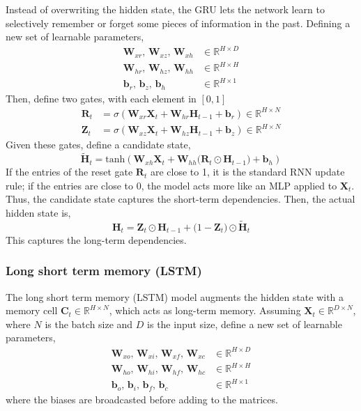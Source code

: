 \documentclass[11pt]{article}
\begin{document}
Instead of overwriting the hidden state, the GRU lets the network learn to selectively remember or forget some pieces of information in the past.
Defining a new set of learnable parameters,
\[
\begin{aligned}
    \mathbf{W}_{xr}, \, \mathbf{W}_{xz}, \, \mathbf{W}_{xh} &\in \mathbb{R}^{H \times D} \\
    \mathbf{W}_{hr}, \, \mathbf{W}_{hz}, \, \mathbf{W}_{hh} &\in \mathbb{R}^{H \times H} \\
    \boldsymbol{b}_r, \, \boldsymbol{b}_z, \, \boldsymbol{b}_h &\in \mathbb{R}^{H \times 1}
\end{aligned}
\]
Then, define two gates, with each element in $\left[ 0, 1 \right]$
\[
\begin{aligned}
    \mathbf{R}_t &= \sigma(\mathbf{W}_{xr}\mathbf{X}_{t} + \mathbf{W}_{hr}\mathbf{H}_{t-1} + \boldsymbol{b}_r) \in \mathbb{R}^{H \times N} \\
    \mathbf{Z}_t &= \sigma(\mathbf{W}_{xz}\mathbf{X}_{t} + \mathbf{W}_{hz}\mathbf{H}_{t-1} + \boldsymbol{b}_z) \in \mathbb{R}^{H \times N}
\end{aligned}
\]
Given these gates, define a candidate state,
\[
\tilde{\mathbf{H}}_t = \text{tanh}(\mathbf{W}_{xh}\mathbf{X}_{t} + \mathbf{W}_{hh} \big(\mathbf{R}_t \odot \mathbf{H}_{t-1}\big) + \boldsymbol{b}_h)
\]
If the entries of the reset gate $\mathbf{R}_t$ are close to 1, it is the standard RNN update rule; if the entries are close to 0, the model acts more like an MLP applied to $\mathbf{X}_t$.
Thus, the candidate state captures the short-term dependencies. Then, the actual hidden state is,
\[
\mathbf{H}_t = \mathbf{Z}_t \odot \mathbf{H}_{t-1} + \big(1 - \mathbf{Z}_t \big) \odot \tilde{\mathbf{H}}_t
\]
This captures the long-term dependencies.


\subsubsection*{Long short term memory (LSTM)}
The long short term memory (LSTM) model augments the hidden state with a
memory cell $\mathbf{C}_t \in \mathbb{R}^{H\times N}$, which acts as long-term memory.
Assuming $\mathbf{X}_t \in \mathbb{R}^{D\times N}$, where $N$ is the batch size and
$D$ is the input size, define a new set of learnable parameters,
\[
\begin{aligned}
\mathbf{W}_{xo},\, \mathbf{W}_{xi},\, \mathbf{W}_{xf},\, \mathbf{W}_{xc} &\in \mathbb{R}^{H\times D} \\
\mathbf{W}_{ho},\, \mathbf{W}_{hi},\, \mathbf{W}_{hf},\, \mathbf{W}_{hc} &\in \mathbb{R}^{H\times H} \\
\boldsymbol{b}_o,\, \boldsymbol{b}_i,\, \boldsymbol{b}_f,\, \boldsymbol{b}_c &\in \mathbb{R}^{H\times 1}
\end{aligned}
\]
where the biases are broadcasted before adding to the matrices.
\end{document}
